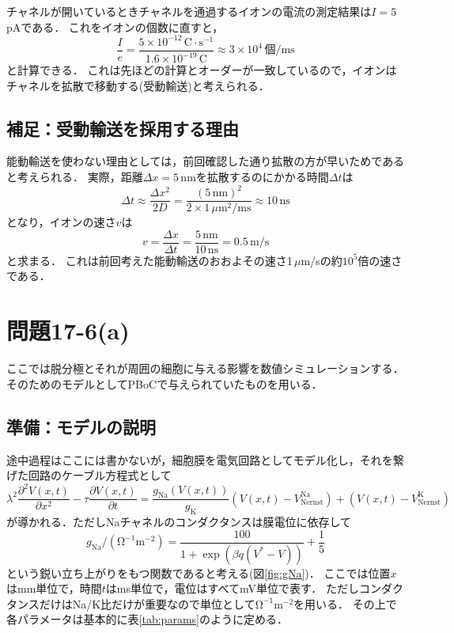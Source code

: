 \documentclass[a4paper,11pt]{jsarticle}
\begin{document}
チャネルが開いているときチャネルを通過するイオンの電流の測定結果は$I=5$\,pAである．
これをイオンの個数に直すと，
\begin{equation}
  \frac{I}{e} = \frac{5\times 10^{-12}\,\mathrm{C}\cdot\mathrm{s}^{-1}}{1.6\times 10^{-19}\,\mathrm{C}} \approx 3\times 10^4\,\mathrm{個/ms}
\end{equation}
と計算できる．
これは先ほどの計算とオーダーが一致しているので，イオンはチャネルを拡散で移動する(受動輸送)と考えられる．

\subsection{補足：受動輸送を採用する理由}
能動輸送を使わない理由としては，前回確認した通り拡散の方が早いためであると考えられる．
実際，距離$\Delta x = 5$\,nmを拡散するのにかかる時間$\Delta t$は
\begin{equation}
  \Delta t \approx \frac{\Delta x^2}{2D} = \frac{(5\,\mathrm{nm})^2}{2\times 1\,\mu \mathrm{m}^2/\mathrm{ms}} \approx 10\,\mathrm{ns}
\end{equation}
となり，イオンの速さ$v$は
\begin{equation}
  v = \frac{\Delta x}{\Delta t} =\frac{5\,\mathrm{nm}}{10\,\mathrm{ns}} = 0.5\,\mathrm{m/s}
\end{equation}
と求まる．
これは前回考えた能動輸送のおおよその速さ1\,$\mu$m/sの約$10^{5}$倍の速さである．

\section{問題17-6(a)}
ここでは脱分極とそれが周囲の細胞に与える影響を数値シミュレーションする．
そのためのモデルとしてPBoCで与えられていたものを用いる．

\subsection{準備：モデルの説明}
途中過程はここには書かないが，細胞膜を電気回路としてモデル化し，それを繋げた回路のケーブル方程式として
\begin{equation}
  \lambda^2 \frac{\partial^2 V(x,t)}{\partial x^2} - \tau \frac{\partial V(x,t)}{\partial t} = \frac{g_{\mathrm{Na}}(V(x,t))}{g_\mathrm{K}}(V(x,t)-V^{\mathrm{Na}}_{\mathrm{Nernst}}) + (V(x,t)-V^{\mathrm{K}}_{\mathrm{Nernst}}) 
  \label{cable}
\end{equation}
が導かれる．ただしNaチャネルのコンダクタンスは膜電位に依存して
\begin{equation}
  g_{\mathrm{Na}}/(\mathrm{\Omega}^{-1}\mathrm{m}^{-2}) = \frac{100}{1+\exp(\beta q(V^{\ast}-V))} + \frac{1}{5}
  \label{gNa}
\end{equation}
という鋭い立ち上がりをもつ関数であると考える(図\ref{fig:gNa})．
ここでは位置$x$はmm単位で，時間$t$はms単位で，電位はすべてmV単位で表す．
ただしコンダクタンスだけはNa/K比だけが重要なので単位として$\mathrm{\Omega}^{-1}\mathrm{m}^{-2}$を用いる．
その上で各パラメータは基本的に表\ref{tab:params}のように定める．
\end{document}
